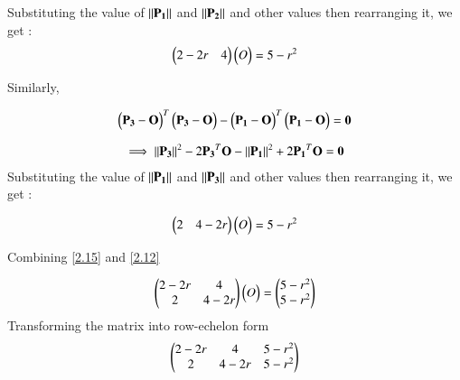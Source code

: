\documentclass[journal,12pt,twocolumn]{IEEEtran}
\begin{document}
 Substituting the value of $\left\lVert\mathbf{P_1}\right\rVert$ and $\left\lVert\mathbf{P_2}\right\rVert$ and other values then rearranging it, we get :
\begin{align}
\begin{pmatrix}2 -2r & 4 \\\end{pmatrix}\begin{pmatrix}O\end{pmatrix} = 5-r^2 \label{2.12}
\end{align}





Similarly,

\begin{align}
\begin{pmatrix}\mathbf{P_3} - \mathbf{O}\end{pmatrix}^T \begin{pmatrix}\mathbf{P_3} - \mathbf{ O}\end{pmatrix} - \begin{pmatrix}\mathbf{P_1} - \mathbf{O}\end{pmatrix}^T\begin{pmatrix}\mathbf{P_1} - \mathbf{O}\end{pmatrix} = \mathbf{0} \label{2.13}
\end{align}



\begin{align}
\implies \left\lVert\mathbf{P_3}\right\rVert^2 - 2 \mathbf{P_3}^T\mathbf{O} - \left\lVert\mathbf{P_1}\right\rVert^2 +2\mathbf{P_1}^T \mathbf{O}  = \mathbf{0} \label{2.14}
\end{align}
Substituting the value of $\left\lVert\mathbf{P_1}\right\rVert$ and $\left\lVert\mathbf{P_3}\right\rVert$ and other values then  rearranging it, we get :

\begin{align}
\begin{pmatrix}2  & 4 -2r \\\end{pmatrix}\begin{pmatrix}O\end{pmatrix} = 5-r^2 \label{2.15}
\end{align}

Combining \ref{2.15} and \ref{2.12}

\begin{align}
\begin{pmatrix}2 - 2r  &  4 \\   2 & 4 - 2r \\\end{pmatrix} \begin{pmatrix}O\end{pmatrix} = \begin{pmatrix}5 - r^2 \\ 5 - r^2 \\\end{pmatrix} \label{2.17}
\end{align}
Transforming the matrix into row-echelon form \\
\begin{align}
\begin{pmatrix}2 - 2r  &  4 &  5 - r^2 \\   2 & 4 - 2r &  5 - r^2 \\\end{pmatrix}  \label{2.18}
\end{align}
\end{document}
